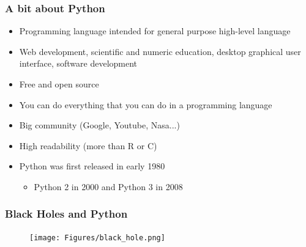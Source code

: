 \documentclass[compress, aspectratio=54]{beamer}
\begin{document}
\begin{frame}
\frametitle{A bit about Python}
\begin{itemize}

\item Programming language intended for general purpose high-level language
\item Web development, scientific and numeric education, desktop graphical user interface, software development
\item Free and open source 
\item You can do everything that you can do in a programming language
\item Big community (Google, Youtube, Nasa...)
\item High readability (more than R or C)
\item Python was first released in early 1980
\begin{itemize}

\item Python 2 in 2000 and Python 3 in 2008
\end{itemize}
\end{itemize}

\end{frame}

\begin{frame}
\frametitle{Black Holes and Python}
\begin{figure}

\texttt{[image: Figures/black\_hole.png]}
\end{figure}

\end{frame}
\end{document}
